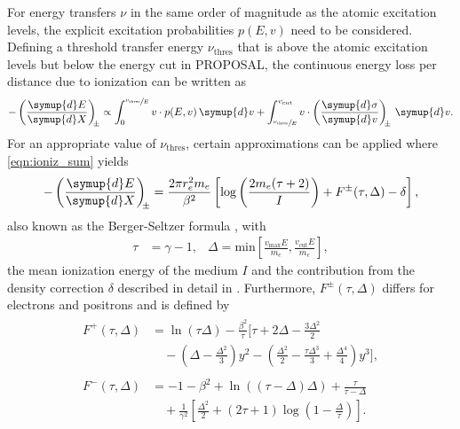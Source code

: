 For energy transfers $\nu$ in the same order of magnitude as the atomic excitation levels, the explicit excitation probabilities $p(E, v)$ need to be considered.
Defining a threshold transfer energy $\nu_{\text{thres}}$ that is above the atomic excitation levels but below the energy cut in PROPOSAL, the continuous energy loss per distance due to ionization can be written as
%
\begin{equation}
	\label{eqn:ioniz_sum}
	-\left(\frac{\symup{d}E}{\symup{d}X}\right)_{\!\!\pm} \propto \int_{0}^{\sfrac{\nu_{\text{thres}}}{E}} v \cdot p(E, v) \, \symup{d}v + \int_{\sfrac{\nu_{\text{thres}}}{E}}^{v_{\text{cut}}} v \cdot \left(\frac{\symup{d}\sigma}{\symup{d}v}\right)_{\!\!\pm} \, \symup{d}v. 
\end{equation}
%
For an appropriate value of $\nu_{\text{thres}}$, certain approximations can be applied where \eqref{eqn:ioniz_sum} yields
%
\begin{equation}
	- \left(\frac{\symup{d}E}{\symup{d}X}\right)_{\!\!\pm} = \frac{2 \pi r_e^2 m_e}{\beta^2} \left[ \log{\left( \frac{2 m_e (\tau + 2)}{I} \right) + F^{\pm}(\tau, \Delta) - \delta } \right],
\end{equation}
%
also known as the Berger-Seltzer formula \cite{Hirayama:2005zm}, with
%
\begin{align}
	\tau &= \gamma - 1, & \Delta = \text{min}\left[ \frac{v_{\text{max}} E}{m_e}, \frac{v_{\text{cut}} E}{m_e} \right],
\end{align}
%
the mean ionization energy of the medium $I$ and the contribution from the density correction $\delta$ described in detail in \cite{Kohne:2013zbq}.
Furthermore, $F^{\pm}(\tau, \Delta)$ differs for electrons and positrons and is defined by
\begin{align}
	\begin{split}
	F^{+}(\tau, \Delta) &= \ln\left(\tau \Delta \right) - \frac{\beta^2}{\tau} \biggl[ \tau + 2 \Delta - \frac{3 \Delta^2 }{2} \\ &\quad- (\Delta - \frac{\Delta^2}{3}) y^2 - ( \frac{\Delta^2}{2} - \frac{\tau\Delta^3}{3} + \frac{\Delta^4}{4} ) y^3 \biggr],
	\end{split}
	\\[2ex]
	\begin{split}
	F^{-}(\tau, \Delta) &= -1 - \beta^2 + \ln\left( (\tau - \Delta) \Delta \right) + \frac{\tau}{\tau - \Delta} \\ &\quad+ \frac{1}{\gamma^2} \left[ \frac{\Delta^2}{2} + (2 \tau + 1) \log\left( 1 - \frac{\Delta}{\tau} \right) \right].
	\end{split}
\end{align}

